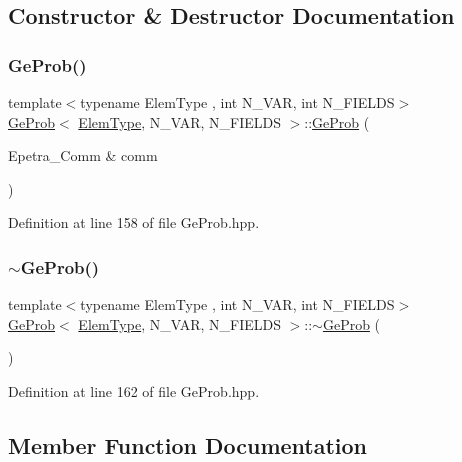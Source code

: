 \subsection{Constructor \& Destructor Documentation}
\mbox{\label{classGeProb_ac03bca1cdd6f679175a861b3b8145e55}} 
\subsubsection{\texorpdfstring{Ge\+Prob()}{GeProb()}}
{\footnotesize\ttfamily template$<$typename Elem\+Type , int N\+\_\+\+V\+AR, int N\+\_\+\+F\+I\+E\+L\+DS$>$ \\
\hyperlink{classGeProb}{Ge\+Prob}$<$ \hyperlink{spectral_8h_aaa2c1a7b2d1b12c590d730fe6ac839fa}{Elem\+Type}, N\+\_\+\+V\+AR, N\+\_\+\+F\+I\+E\+L\+DS $>$\+::\hyperlink{classGeProb}{Ge\+Prob} (\begin{DoxyParamCaption}\item[{Epetra\+\_\+\+Comm \&}]{comm }\end{DoxyParamCaption})}



Definition at line 158 of file Ge\+Prob.\+hpp.

\mbox{\label{classGeProb_ab4bb730d1218feabfd8b1d8e8c0130aa}} 
\subsubsection{\texorpdfstring{$\sim$\+Ge\+Prob()}{~GeProb()}}
{\footnotesize\ttfamily template$<$typename Elem\+Type , int N\+\_\+\+V\+AR, int N\+\_\+\+F\+I\+E\+L\+DS$>$ \\
\hyperlink{classGeProb}{Ge\+Prob}$<$ \hyperlink{spectral_8h_aaa2c1a7b2d1b12c590d730fe6ac839fa}{Elem\+Type}, N\+\_\+\+V\+AR, N\+\_\+\+F\+I\+E\+L\+DS $>$\+::$\sim$\hyperlink{classGeProb}{Ge\+Prob} (\begin{DoxyParamCaption}{ }\end{DoxyParamCaption})}



Definition at line 162 of file Ge\+Prob.\+hpp.



\subsection{Member Function Documentation}
\mbox{\label{classGeProb_ab622a6354ec337bab6c2563049b0db4f}} 
